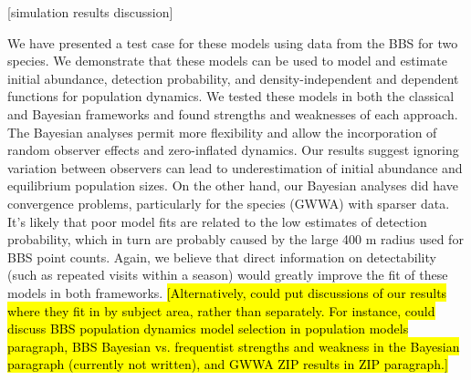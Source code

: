 \documentclass[12pt]{article}
\begin{document}

[simulation results discussion]

We have presented a test case for these models using data from
the BBS for two species. We demonstrate that these models can be
used to model and estimate initial abundance, detection
probability, and density-independent and dependent functions for
population dynamics. We tested these models in both the
classical and Bayesian frameworks and found strengths and
weaknesses of each approach. The Bayesian analyses permit more
flexibility and allow the incorporation of random observer
effects and zero-inflated dynamics. Our results suggest ignoring
variation between observers can lead to underestimation of
initial abundance and equilibrium population sizes. On the other
hand, our Bayesian analyses did have convergence problems,
particularly for the species (GWWA) with sparser data. It's
likely that poor model fits are related to the low estimates of
detection probability, which in turn are probably caused by the
large 400 m radius used for BBS point counts. Again, we believe
that direct information on detectability (such as repeated
visits within a season) would greatly improve the fit of these
models in both frameworks.
\hl{[Alternatively, could put discussions of our results where
they fit in by subject area, rather than separately. For
instance, could discuss BBS population dynamics model selection
in population models paragraph, BBS Bayesian vs.
frequentist strengths and weakness in the Bayesian paragraph
(currently not written), and GWWA ZIP results in ZIP paragraph.]}
\end{document}
